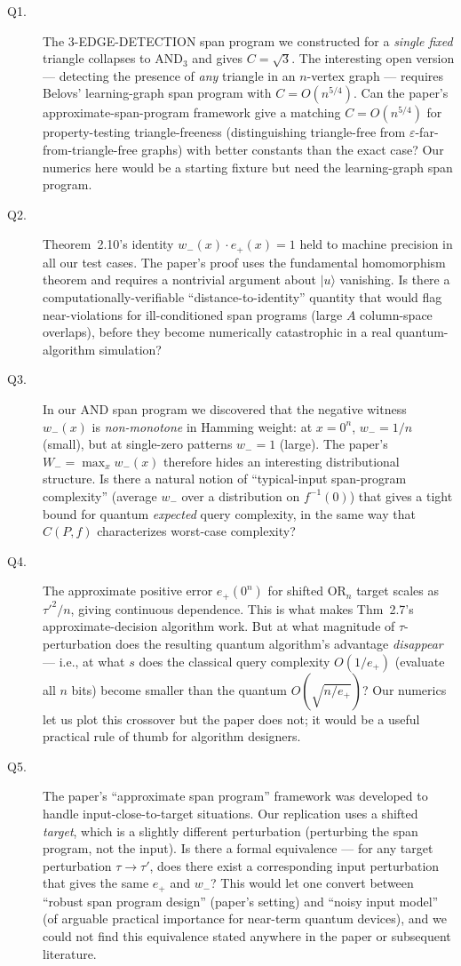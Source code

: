 \documentclass[11pt]{article}
\begin{document}
\begin{description}
\item[Q1.] The 3-EDGE-DETECTION span program we constructed for a \emph{single fixed} triangle collapses to $\mathrm{AND}_3$ and gives $C = \sqrt{3}$. The interesting open version --- detecting the presence of \emph{any} triangle in an $n$-vertex graph --- requires Belovs' learning-graph span program with $C = O(n^{5/4})$. Can the paper's approximate-span-program framework give a matching $C = O(n^{5/4})$ for property-testing triangle-freeness (distinguishing triangle-free from $\varepsilon$-far-from-triangle-free graphs) with better constants than the exact case? Our numerics here would be a starting fixture but need the learning-graph span program.
\item[Q2.] Theorem~2.10's identity $w_-(x)\cdot e_+(x) = 1$ held to machine precision in all our test cases. The paper's proof uses the fundamental homomorphism theorem and requires a nontrivial argument about $|u\rangle$ vanishing. Is there a computationally-verifiable ``distance-to-identity'' quantity that would flag near-violations for ill-conditioned span programs (large $A$ column-space overlaps), before they become numerically catastrophic in a real quantum-algorithm simulation?
\item[Q3.] In our AND span program we discovered that the negative witness $w_-(x)$ is \emph{non-monotone} in Hamming weight: at $x = 0^n$, $w_- = 1/n$ (small), but at single-zero patterns $w_- = 1$ (large). The paper's $W_- = \max_x w_-(x)$ therefore hides an interesting distributional structure. Is there a natural notion of ``typical-input span-program complexity'' (average $w_-$ over a distribution on $f^{-1}(0)$) that gives a tight bound for quantum \emph{expected} query complexity, in the same way that $C(P,f)$ characterizes worst-case complexity?
\item[Q4.] The approximate positive error $e_+(0^n)$ for shifted $\mathrm{OR}_n$ target scales as $\tau'^2/n$, giving continuous dependence. This is what makes Thm~2.7's approximate-decision algorithm work. But at what magnitude of $\tau$-perturbation does the resulting quantum algorithm's advantage \emph{disappear} --- i.e., at what $s$ does the classical query complexity $O(1/e_+)$ (evaluate all $n$ bits) become smaller than the quantum $O(\sqrt{n/e_+})$? Our numerics let us plot this crossover but the paper does not; it would be a useful practical rule of thumb for algorithm designers.
\item[Q5.] The paper's ``approximate span program'' framework was developed to handle input-close-to-target situations. Our replication uses a shifted \emph{target}, which is a slightly different perturbation (perturbing the span program, not the input). Is there a formal equivalence --- for any target perturbation $\tau \to \tau'$, does there exist a corresponding input perturbation that gives the same $e_+$ and $w_-$? This would let one convert between ``robust span program design'' (paper's setting) and ``noisy input model'' (of arguable practical importance for near-term quantum devices), and we could not find this equivalence stated anywhere in the paper or subsequent literature.
\end{description}
\end{document}
